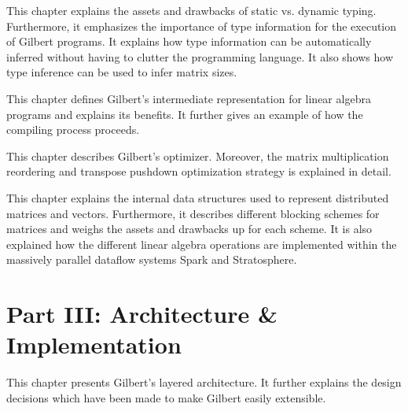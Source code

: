 \vspace{1mm}


\noindent This chapter explains the assets and drawbacks of static vs. dynamic typing.
Furthermore, it emphasizes the importance of type information for the execution of Gilbert programs. 
It explains how type information can be automatically inferred without having to clutter the programming language.
It also shows how type inference can be used to infer matrix sizes.

\vspace{1mm}


\noindent This chapter defines Gilbert's intermediate representation for linear algebra programs and explains its benefits.
It further gives an example of how the compiling process proceeds.

\vspace{1mm}


\noindent This chapter describes Gilbert's optimizer.
Moreover, the matrix multiplication reordering and transpose pushdown optimization strategy is explained in detail.

 \vspace{1mm}


\noindent This chapter explains the internal data structures used to represent distributed matrices and vectors.
Furthermore, it describes different blocking schemes for matrices and weighs the assets and drawbacks up for each scheme.
It is also explained how the different linear algebra operations are implemented within the massively parallel dataflow systems Spark and Stratosphere.

\vspace{1mm}

\section*{Part III: Architecture \& Implementation}


\noindent This chapter presents Gilbert's layered architecture.
It further explains the design decisions which have been made to make Gilbert easily extensible.

